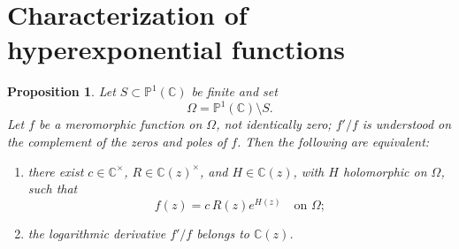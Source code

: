 \documentclass[reqno]{article}
\newtheorem{prop}[theorem]{Proposition}
\theoremstyle{definition}
\theoremstyle{remark}
\theoremstyle{plain}
\begin{document}
\appendix
\section{Characterization of hyperexponential functions}\label{app:mixed}
\begin{prop}
Let $S\subset \mathbb P^1(\mathbb C)$ be finite and set
\[\Omega=\mathbb P^1(\mathbb C)\setminus S.\]
Let $f$ be a meromorphic function on $\Omega$, not identically zero; $f'/f$ is understood on the complement of the zeros and poles of $f$. Then the following are equivalent:
\begin{enumerate}
    \item there exist $c\in \mathbb C^\times$, $R\in\mathbb C(z)^\times$, and $H\in \mathbb C(z)$, with $H$ holomorphic on $\Omega$, such that
    \[
    f(z)=c\,R(z)e^{H(z)} \quad \text{on } \Omega;
    \]
    \item the logarithmic derivative $f'/f$ belongs to $\mathbb C(z)$.
\end{enumerate}
\end{prop}
\end{document}
